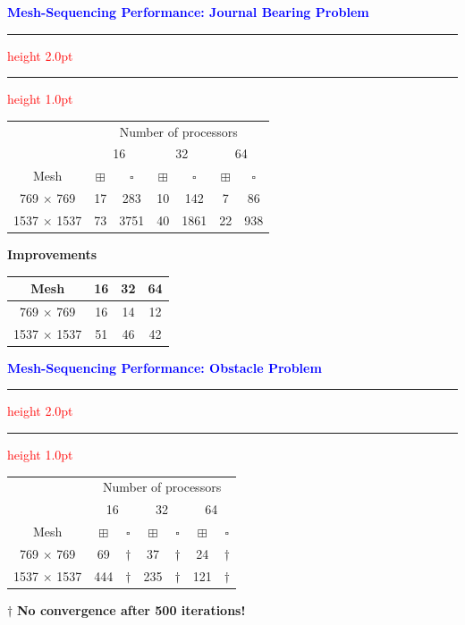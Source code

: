 \documentclass{seminar}
\newcommand{\redstripe}{\textcolor{red}{\hrule height 2.0pt\hfil}
             \vspace{-1.8pt}
             \textcolor{red}{\hrule height 1.0pt\hfil}
}
\newcommand{\heading}[1]{%
   \centerline{\textcolor{blue}{\textbf{#1}}}%
    \redstripe%
    \bigskip
}
\begin{document}
\begin{slide}

\heading{Mesh-Sequencing Performance: Journal Bearing Problem}

\begin{center}
\begin{tabular}{ccccccc}
      & \multicolumn{6}{c}{Number of processors} \\ \cline{2-7}
      &  \multicolumn{2}{c}{16} & \multicolumn{2}{c}{32} &
         \multicolumn{2}{c}{64} \\  \cline{2-7}
 Mesh & $ \boxplus $ & $ \square $ & $ \boxplus $ & $ \square $ & $ \boxplus $ & $ \square $ \\
\hline
 769 $\times$  769  &  17  &   283  &   10   &   142   &    7  &   86 \\
1537 $\times$  1537 &  73  &  3751  &   40   &  1861   &   22  &  938 \\
\hline
\end{tabular}
\end{center}

\bigskip\bigskip

\textbf{Improvements} \qquad \qquad 
\begin{tabular}{cccc}
 Mesh &  16  &  32  &  64  \\
\hline
 769 $\times$  769  &  16  &  14  & 12 \\
1537 $\times$  1537 &  51  &  46  & 42  \\
\hline
\end{tabular}

\vfill

\end{slide}

\begin{slide}

\heading{Mesh-Sequencing Performance: Obstacle Problem}

\begin{center}
\begin{tabular}{ccccccc}
      & \multicolumn{6}{c}{Number of processors} \\ \cline{2-7}
      &  \multicolumn{2}{c}{16} & \multicolumn{2}{c}{32} &
         \multicolumn{2}{c}{64} \\  \cline{2-7}
 Mesh & $ \boxplus $ & $ \square $ & $ \boxplus $ & $ \square $ & $ \boxplus $ & $ \square $ \\
\hline
 769 $\times$  769  &  69  & $\dagger$ &  37 & $\dagger$ &  24  & $\dagger$ \\
1537 $\times$  1537 &  444 & $\dagger$ & 235 & $\dagger$ & 121  & $\dagger$ \\
\hline
\end{tabular}
\end{center}

\bigskip\bigskip

$\dagger$ \textbf{No convergence after 500 iterations!}

\vfill

\end{slide}
\end{document}
